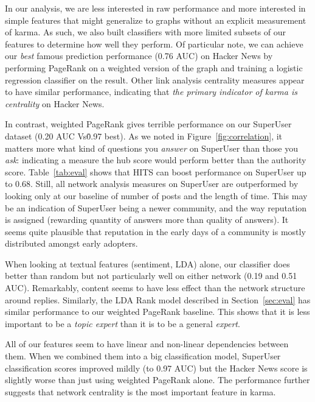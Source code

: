 \documentclass[11pt]{article}
\begin{document}
In our analysis, we are less interested in raw performance and more interested in 
simple features that might generalize
to graphs without an explicit measurement of karma. As such, we also built classifiers
with more limited subsets of our features to determine how well they perform. Of particular note,
we can achieve our \textit{best} famous prediction performance (0.76 AUC) 
on Hacker News by performing PageRank on a weighted version of the graph and training
a logistic regression classifier on the result. Other link analysis centrality measures 
appear to have similar performance, indicating that \textit{the primary indicator of karma 
is centrality} on Hacker News.

In contrast, weighted PageRank gives terrible performance on our SuperUser dataset
(0.20 AUC Vs\. 0.97 best). As we noted in Figure~\ref{fig:correlation}, it matters
more what kind of questions you \textit{answer} on SuperUser than those you 
\textit{ask}: indicating a measure the hub score would perform better than
the authority score. Table~\ref{tab:eval} shows that HITS can boost performance
on SuperUser up to 0.68. Still, all network analysis measures on SuperUser 
are outperformed by looking only at our baseline of number of posts and the length
of time. This may be an indication of SuperUser being a newer community, and the
way reputation is assigned (rewarding quantity of answers more than quality of answers).
It seems quite plausible that reputation in the early days of a community is mostly
distributed amongst early adopters.

When looking at textual features (sentiment, LDA) alone, our classifier does better than random 
but not particularly well on either network (0.19 and 0.51 AUC). Remarkably, content
seems to have less effect than the network structure around replies. Similarly, the LDA Rank model 
described in Section~\ref{sec:eval} has similar performance to our weighted PageRank baseline. 
This shows that it is less important to be a \textit{topic expert} than it is to be a general
\textit{expert}.

All of our features seem to have linear and non-linear dependencies between them. When we combined
them into a big classification model, SuperUser classification scores improved mildly (to 0.97 AUC)
but the Hacker News score is slightly worse than just using weighted PageRank alone. The performance
further suggests that network centrality is the most important feature in karma.
\end{document}
